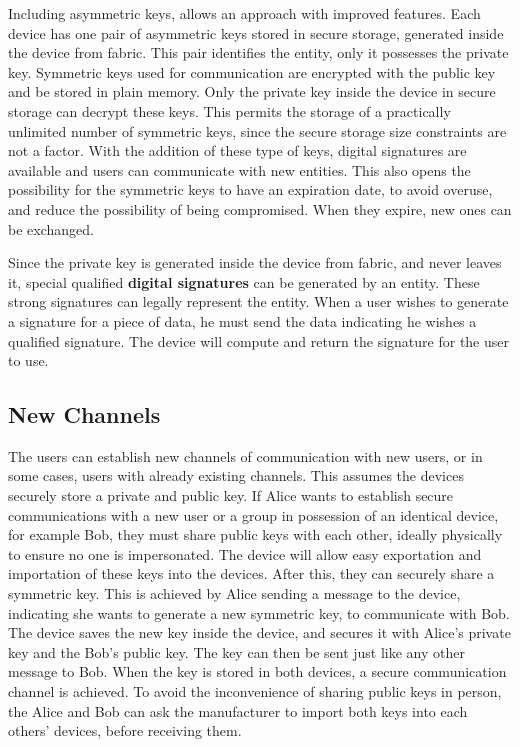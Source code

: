 Including asymmetric keys, allows an approach with improved features.
Each device has one pair of asymmetric keys stored in secure storage, generated inside the device from fabric. This pair identifies the entity, only it possesses the private key. Symmetric keys used for communication are encrypted with the public key and be stored in plain memory. Only the private key inside the device in secure storage can decrypt these keys. This permits the storage of a practically unlimited number of symmetric keys, since the secure storage size constraints are not a factor.
With the addition of these type of keys, digital signatures are available and users can communicate with new entities. This also opens the possibility for the symmetric keys to have an expiration date, to avoid overuse, and reduce the possibility of being compromised. When they expire, new ones can be exchanged.

Since the private key is generated inside the device from fabric, and never leaves it, special qualified \textbf{digital signatures} can be generated by an entity. These strong signatures can legally represent the entity. When a user wishes to generate a signature for a piece of data, he must send the data indicating he wishes a qualified signature. The device will compute and return the signature for the user to use.

\subsection{New Channels}\label{chap:problem:scenarios:keys}

The users can establish new channels of communication with new users, or in some cases, users with already existing channels. This assumes the devices securely store a private and public key.
If Alice wants to establish secure communications with a new user or a group in possession of an identical device, for example Bob, they must share public keys with each other, ideally physically to ensure no one is impersonated. The device will allow easy exportation and importation of these keys into the devices. After this, they can securely share a symmetric key. This is achieved by Alice sending a message to the device, indicating she wants to generate a new symmetric key, to communicate with Bob. The device saves the new key inside the device, and secures it with Alice's private key and the Bob's public key. The key can then be sent just like any other message to Bob. When the key is stored in both devices, a secure communication channel is achieved.
To avoid the inconvenience of sharing public keys in person, the Alice and Bob can ask the manufacturer to import both keys into each others' devices, before receiving them.

